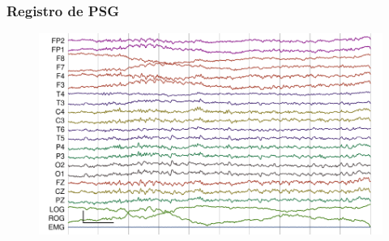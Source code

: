 \documentclass[serif,mathserif,professionalfont]{beamer}
\begin{document}
\begin{frame}\frametitle{Registro de PSG}
\begin{figure}
\centering
\includegraphics[width=0.9\linewidth]{./img_ejemplos/MJNN_epoca_stam.pdf}
\end{figure}
\end{frame}

\end{document}
